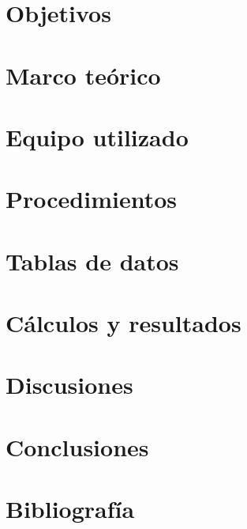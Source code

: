 \documentclass[12pt, a4paper]{article}
\begin{document}


\pagestyle{fancy}
\fancyfoot{} %
\fancyfoot[R]{\thepage}

\tableofcontents
\clearpage

\section{Objetivos}


\section{Marco teórico}


\section{Equipo utilizado}


\section{Procedimientos}


\section{Tablas de datos}


\section{Cálculos y resultados}


\section{Discusiones}


\section{Conclusiones}


\section{Bibliografía}
\printbibliography

\clearpage
\end{document}
